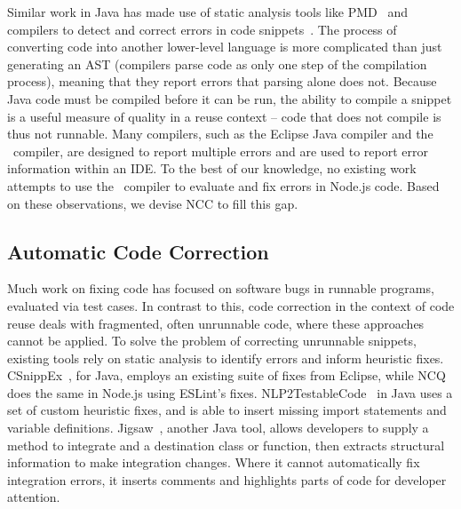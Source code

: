 \documentclass[conference]{IEEEtran}
\begin{document}
Similar work in Java has made use of static analysis tools like PMD~\cite{pmd} and compilers to detect and correct errors in code snippets~\cite{reidnlp2tc, terragni2016csnippex, 10.1145/3520304.3528772, 10.1145/3520304.3533970}. The process of converting code into another lower-level language is more complicated than just generating an AST (compilers parse code as only one step of the compilation process), meaning that they report errors that parsing alone does not. Because Java code must be compiled before it can be run, the ability to compile a snippet is a useful measure of quality in a reuse context -- code that does not compile is thus not runnable. Many compilers, such as the Eclipse Java compiler and the \ts\ compiler, are designed to report multiple errors and are used to report error information within an IDE. To the best of our knowledge, no existing work attempts to use the \ts\ compiler to evaluate and fix errors in Node.js code. Based on these observations, we devise NCC to fill this gap.

\subsection{Automatic Code Correction}

Much work on fixing code has focused on software bugs in runnable programs, evaluated via test cases. In contrast to this, code correction in the context of code reuse deals with fragmented, often unrunnable code, where these approaches cannot be applied. To solve the problem of correcting unrunnable snippets, existing tools rely on static analysis to identify errors and inform heuristic fixes. CSnippEx~\cite{terragni2016csnippex}, for Java, employs an existing suite of fixes from Eclipse, while NCQ~\cite{reidNCQ} does the same in Node.js using ESLint's fixes. NLP2TestableCode~\cite{reidnlp2tc} in Java uses a set of custom heuristic fixes, and is able to insert missing import statements and variable definitions. Jigsaw~\cite{cottrell2008Jigsaw}, another Java tool, allows developers to supply a method to integrate and a destination class or function, then extracts structural information to make integration changes. Where it cannot automatically fix integration errors, it inserts comments and highlights parts of code for developer attention. 
\end{document}
